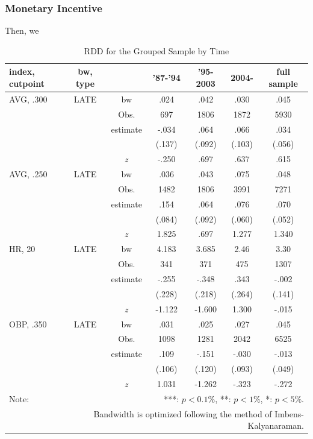 \documentclass[dvipdfmx, 12pt]{article}
\begin{document}
\subsubsection{Monetary Incentive}

Then, we

\begin{table}
  \centering
  \caption{RDD for the Grouped Sample by Time}
  \label{RDD_Era}
  \footnotesize
  \begin{tabular}{lcccccc} \hline
    index, cutpoint & bw, type &  &'87-'94 & '95-2003 & 2004- &full sample \\ \hline \hline
    AVG, .300 & LATE & bw & .024 & .042 & .030 & .045 \\
    &  & Obs. & 697 & 1806 & 1872 & 5930 \\
    &  & estimate & -.034 & .064 & .066 & .034 \\
    &  & & (.137) & (.092) & (.103) & (.056) \\
    & & $z$ & -.250 & .697 & .637 & .615 \\ \hline
    AVG, .250 & LATE & bw & .036 & .043 &.075 & .048 \\
    &  & Obs. & 1482 & 1806 & 3991 & 7271 \\
    &  & estimate & .154 & .064 & .076 & .070 \\
    &  & & (.084) & (.092) & (.060) & (.052) \\
    & & $z$ & 1.825 & .697 & 1.277 & 1.340 \\ \hline
    HR, 20 & LATE & bw & 4.183 & 3.685 & 2.46 & 3.30 \\
    &  & Obs. & 341 & 371 & 475 & 1307 \\
    &  & estimate & -.255 & -.348 & .343 & -.002 \\
    &  & & (.228) & (.218) & (.264) & (.141) \\
    & & $z$ & -1.122 & -1.600 & 1.300 & -.015 \\ \hline
    OBP, .350 & LATE & bw & .031 & .025 & .027 & .045 \\
    &  & Obs. & 1098 & 1281 & 2042 & 6525 \\
    &  & estimate & .109 & -.151 & -.030 & -.013 \\
    &  & & (.106) & (.120) & (.093) & (.049) \\
    & & $z$ & 1.031 & -1.262 & -.323 & -.272 \\ \hline
    Note: & \multicolumn{6}{r}{***: $p<0.1\%$, **: $p<1\%$, *: $p<5\%$.} \\
    & \multicolumn{6}{r}{Bandwidth is optimized following the method of Imbens-Kalyanaraman.}
  \end{tabular}
\end{table}
\end{document}
